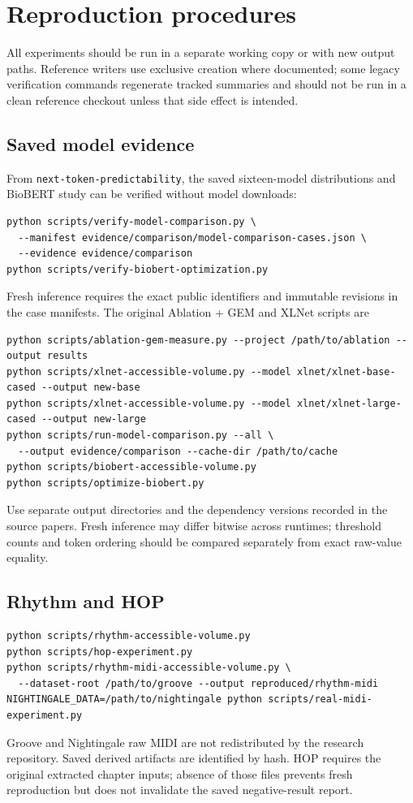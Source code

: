 \section{Reproduction procedures}
\label{app:reproduction}
All experiments should be run in a separate working copy or with new output paths. Reference writers use exclusive creation where documented; some legacy verification commands regenerate tracked summaries and should not be run in a clean reference checkout unless that side effect is intended.

\subsection{Saved model evidence}
From \texttt{next-token-predictability}, the saved sixteen-model distributions and BioBERT study can be verified without model downloads:
\begin{lstlisting}
python scripts/verify-model-comparison.py \
  --manifest evidence/comparison/model-comparison-cases.json \
  --evidence evidence/comparison
python scripts/verify-biobert-optimization.py
\end{lstlisting}
Fresh inference requires the exact public identifiers and immutable revisions in the case manifests. The original Ablation + GEM and XLNet scripts are
\begin{lstlisting}
python scripts/ablation-gem-measure.py --project /path/to/ablation --output results
python scripts/xlnet-accessible-volume.py --model xlnet/xlnet-base-cased --output new-base
python scripts/xlnet-accessible-volume.py --model xlnet/xlnet-large-cased --output new-large
python scripts/run-model-comparison.py --all \
  --output evidence/comparison --cache-dir /path/to/cache
python scripts/biobert-accessible-volume.py
python scripts/optimize-biobert.py
\end{lstlisting}
Use separate output directories and the dependency versions recorded in the source papers. Fresh inference may differ bitwise across runtimes; threshold counts and token ordering should be compared separately from exact raw-value equality.

\subsection{Rhythm and HOP}
\begin{lstlisting}
python scripts/rhythm-accessible-volume.py
python scripts/hop-experiment.py
python scripts/rhythm-midi-accessible-volume.py \
  --dataset-root /path/to/groove --output reproduced/rhythm-midi
NIGHTINGALE_DATA=/path/to/nightingale python scripts/real-midi-experiment.py
\end{lstlisting}
Groove and Nightingale raw MIDI are not redistributed by the research repository. Saved derived artifacts are identified by hash. HOP requires the original extracted chapter inputs; absence of those files prevents fresh reproduction but does not invalidate the saved negative-result report.

